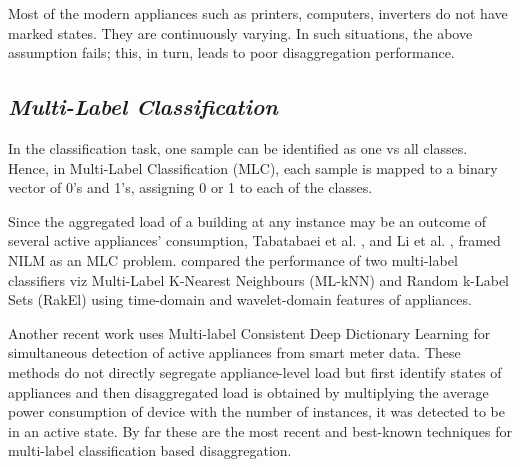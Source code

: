 \documentclass{article}
\begin{document}
 Most of the modern appliances such as printers, computers, inverters do not have marked states. They are continuously varying. In such situations, the above assumption fails; this, in turn, leads to poor disaggregation performance.

\subsection{\textit{ Multi-Label Classification }}

In the classification task, one sample can be identified as one vs all classes. Hence, in Multi-Label Classification (MLC), each sample is mapped to a binary vector of 0's and 1's, assigning 0 or 1 to each of the classes.

Since the aggregated load of a building at any instance may be an outcome of several active appliances' consumption, Tabatabaei et al. \cite{tabatabaei2017toward}, and Li et al. \cite{li2016whole}, framed NILM as an MLC problem. \cite{tabatabaei2017toward} compared the performance of two multi-label classifiers viz Multi-Label K-Nearest Neighbours (ML-kNN) and Random k-Label Sets (RakEl) using time-domain and wavelet-domain features of appliances.

Another recent work \cite{singhal2018simultaneous} uses Multi-label Consistent Deep Dictionary Learning for simultaneous detection of active appliances from smart meter data. These methods do not directly segregate appliance-level load but first identify states of appliances and then disaggregated load is obtained by multiplying the average power consumption of device with the number of instances, it was detected to be in an active state. By far these are the most recent and best-known techniques for multi-label classification based disaggregation.
\end{document}
